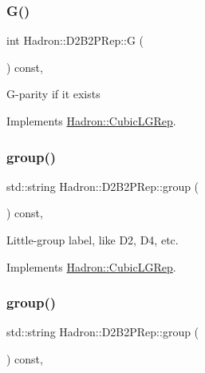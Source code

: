 \subsubsection{\texorpdfstring{G()}{G()}\hspace{0.1cm}{\footnotesize\ttfamily [2/2]}}
{\footnotesize\ttfamily int Hadron\+::\+D2\+B2\+P\+Rep\+::G (\begin{DoxyParamCaption}{ }\end{DoxyParamCaption}) const\hspace{0.3cm}{\ttfamily [inline]}, {\ttfamily [virtual]}}

G-\/parity if it exists 

Implements \mbox{\hyperlink{structHadron_1_1CubicLGRep_ace26f7b2d55e3a668a14cb9026da5231}{Hadron\+::\+Cubic\+L\+G\+Rep}}.

\mbox{\label{structHadron_1_1D2B2PRep_a5e6b85d31dc1c9bec4956b4c6bccd01e}} 
\subsubsection{\texorpdfstring{group()}{group()}\hspace{0.1cm}{\footnotesize\ttfamily [1/2]}}
{\footnotesize\ttfamily std\+::string Hadron\+::\+D2\+B2\+P\+Rep\+::group (\begin{DoxyParamCaption}{ }\end{DoxyParamCaption}) const\hspace{0.3cm}{\ttfamily [inline]}, {\ttfamily [virtual]}}

Little-\/group label, like D2, D4, etc. 

Implements \mbox{\hyperlink{structHadron_1_1CubicLGRep_a9bdb14b519a611d21379ed96a3a9eb41}{Hadron\+::\+Cubic\+L\+G\+Rep}}.

\mbox{\label{structHadron_1_1D2B2PRep_a5e6b85d31dc1c9bec4956b4c6bccd01e}} 
\subsubsection{\texorpdfstring{group()}{group()}\hspace{0.1cm}{\footnotesize\ttfamily [2/2]}}
{\footnotesize\ttfamily std\+::string Hadron\+::\+D2\+B2\+P\+Rep\+::group (\begin{DoxyParamCaption}{ }\end{DoxyParamCaption}) const\hspace{0.3cm}{\ttfamily [inline]}, {\ttfamily [virtual]}}

